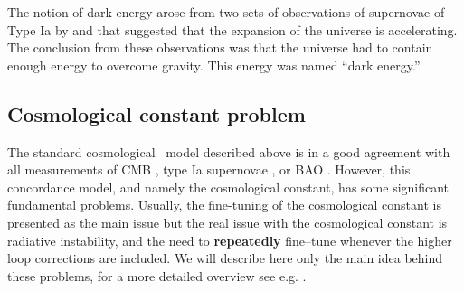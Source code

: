 The notion of dark energy arose from two sets of observations of supernovae of Type Ia by \textcite{riess} and \textcite{1999ApJ...517..565P} that suggested that the expansion of the universe is accelerating. The conclusion from these observations was that the universe had to contain enough energy to overcome gravity. This energy was named “dark energy.”

\subsection{Cosmological constant problem}
\label{ssec:lambda}
The standard cosmological \LCDM\ model described above is in a good agreement with all measurements of CMB \parencite{planck_cosm}, type Ia supernovae \parencite{Abbott_2019}, or BAO \parencite{BAO_results}. However, this concordance model, and namely the cosmological constant, has some significant fundamental problems. Usually, the fine-tuning of the cosmological constant is presented as the main issue but the real issue with the cosmological constant is radiative instability, and the need to \textbf{repeatedly} fine--tune whenever the higher loop corrections are included. We will describe here only the main idea behind these problems, for a more detailed overview see e.g. \textcite{2015arXiv150205296P,2012CRPhy..13..566M}.

